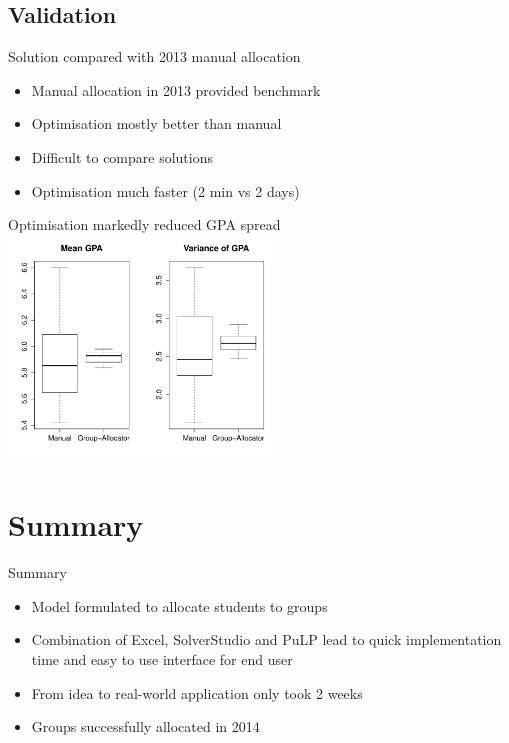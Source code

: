 \documentclass{beamer}
\begin{document}
\subsection{Validation}
\begin{frame}{Solution compared with 2013 manual allocation}
  \begin{itemize}
    \item Manual allocation in 2013 provided benchmark
    \item Optimisation mostly better than manual
    \item Difficult to compare solutions
    \item Optimisation much faster (2 min vs 2 days)
  \end{itemize}
\end{frame}
\begin{frame}{Optimisation markedly reduced GPA spread}
\centering
\includegraphics[height=6cm]{gpa_plot.pdf}
\end{frame}

\section*{Summary}
\begin{frame}{Summary}
\begin{itemize}
  \item Model formulated to allocate students to groups
  \item Combination of Excel, SolverStudio and PuLP lead to quick implementation time and easy to use interface for end user
  \item From idea to real-world application only took 2 weeks
  \item Groups successfully allocated in 2014
\end{itemize}
\end{frame}
\end{document}
